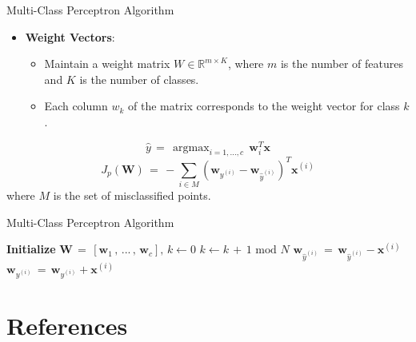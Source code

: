 \documentclass[serif, aspectratio=169]{beamer}
\DeclareMathOperator*{\argmax}{argmax}
\begin{document}
\begin{frame}{Multi-Class Perceptron Algorithm}
    \begin{itemize}
        \item \textbf{Weight Vectors}:
        \medskip
        \begin{itemize}\itemsep.8em
            \item Maintain a weight matrix \( W \in \mathbb{R}^{m \times K} \), where \( m \) is the number of features and \( K \) is the number of classes.
        \item Each column \( w_k \) of the matrix corresponds to the weight vector for class \( k \).
        \end{itemize}
    \end{itemize}
    \hspace{4cm}
    \[
    \hat{y} \, = \, \argmax_{i=1,...,c} \, \mathbf{w}_i^T \mathbf{x}
    \]
    \[
    J_p(\mathbf{W}) \, = \, - \sum_{i \in M}(\mathbf{w}_{y^{(i)}} - \mathbf{w}_{\hat{y}^{(i)}})^T\mathbf{x}^{(i)}
    \]
    where \( M \) is the set of misclassified points.
\end{frame}


\begin{frame}{Multi-Class Perceptron Algorithm}

    \begin{algorithm}[H]
    \caption{Multi-class perceptron}\label{alg:Multi-class perceptron}
    \begin{algorithmic}[1]
        \State \textbf{Initialize} $\mathbf{W} \, = \, [\mathbf{w}_1 \, , \, ... \, , \, \mathbf{w}_c], \, k \leftarrow 0$
            \State \(k \leftarrow k \, + \, 1 \text{ mod } N\)
            \State \(\mathbf{w}_{\hat{y}^{(i)}} \, = \, \mathbf{w}_{\hat{y}^{(i)}} - \mathbf{x}^{(i)}\)
            \State \(\mathbf{w}_{y^{(i)}} \, = \, \mathbf{w}_{y^{(i)}} + \mathbf{x}^{(i)}\)
            \EndIf
        \EndWhile
    \end{algorithmic}
    \end{algorithm}
    
\end{frame}


\section{References}

\begin{frame}[allowframebreaks]
    
    
    \nocite{*} %
\end{frame}
\end{document}
